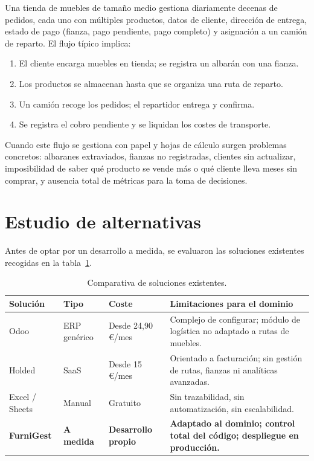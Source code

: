 \documentclass[12pt,twoside,titlepage]{report}
\begin{document}
Una tienda de muebles de tamaño medio gestiona diariamente decenas de pedidos, cada uno con múltiples productos, datos de cliente, dirección de entrega, estado de pago (fianza, pago pendiente, pago completo) y asignación a un camión de reparto. El flujo típico implica:

\begin{enumerate}[nosep]
  \item El cliente encarga muebles en tienda; se registra un albarán con una fianza.
  \item Los productos se almacenan hasta que se organiza una ruta de reparto.
  \item Un camión recoge los pedidos; el repartidor entrega y confirma.
  \item Se registra el cobro pendiente y se liquidan los costes de transporte.
\end{enumerate}

Cuando este flujo se gestiona con papel y hojas de cálculo surgen problemas concretos: albaranes extraviados, fianzas no registradas, clientes sin actualizar, imposibilidad de saber qué producto se vende más o qué cliente lleva meses sin comprar, y ausencia total de métricas para la toma de decisiones.

\section{Estudio de alternativas}

Antes de optar por un desarrollo a medida, se evaluaron las soluciones existentes recogidas en la tabla~\ref{tab:alternativas}.

\begin{table}[H]
  \centering
  \caption{Comparativa de soluciones existentes.}
  \label{tab:alternativas}
  \begin{tabularx}{\textwidth}{lllX}
    \toprule
    \textbf{Solución} & \textbf{Tipo} & \textbf{Coste} & \textbf{Limitaciones para el dominio} \\
    \midrule
    Odoo        & ERP genérico & Desde 24,90\,\euro/mes & Complejo de configurar; módulo de logística no adaptado a rutas de muebles. \\
    Holded      & SaaS         & Desde 15\,\euro/mes    & Orientado a facturación; sin gestión de rutas, fianzas ni analíticas avanzadas. \\
    Excel / Sheets & Manual    & Gratuito               & Sin trazabilidad, sin automatización, sin escalabilidad. \\
    \textbf{FurniGest} & \textbf{A medida} & \textbf{Desarrollo propio} & \textbf{Adaptado al dominio; control total del código; despliegue en producción.} \\
    \bottomrule
  \end{tabularx}
\end{table}
\end{document}
